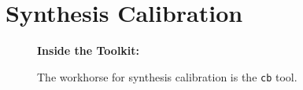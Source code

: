 



\chapter{Synthesis Calibration}
\label{chapter:cal}

\begin{wrapfigure}{r}{2.5in}
  \begin{boxedminipage}{2.5in}
     \centerline{\bf Inside the Toolkit:}
     The workhorse for synthesis calibration is the {\tt cb} tool.
  \end{boxedminipage}
\end{wrapfigure}

